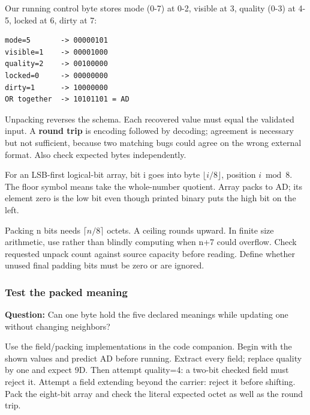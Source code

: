 Our running control byte stores mode (0-7) at 0-2, visible at 3, quality (0-3) at 4-5, locked at 6, dirty at 7:

\begin{verbatim}
mode=5       -> 00000101
visible=1    -> 00001000
quality=2    -> 00100000
locked=0     -> 00000000
dirty=1      -> 10000000
OR together  -> 10101101 = AD
\end{verbatim}

Unpacking reverses the schema. Each recovered value must equal the validated input. A \textbf{round trip} is encoding followed by decoding; agreement is necessary but not sufficient, because two matching bugs could agree on the wrong external format. Also check expected bytes independently.

For an LSB-first logical-bit array, bit i goes into byte \(\lfloor i/8\rfloor\), position \(i\bmod8\). The floor symbol means take the whole-number quotient. Array \BookInlineCode{{{[}}{1}{,}{0}{,}{1}{,}{1}{,}{0}{,}{1}{,}{0}{,}{1}{{]}}}{{[}1,0,1,1,0,1,0,1{]}} packs to AD; its element zero is the low bit even though printed binary puts the high bit on the left.

Packing n bits needs \(\lceil n/8\rceil\) octets. A ceiling rounds upward. In finite size arithmetic, use  rather than blindly computing  when n+7 could overflow. Check requested unpack count against source capacity before reading. Define whether unused final padding bits must be zero or are ignored.

\subsubsection{Test the packed meaning}\label{05-engine-i-ch001-test-the-packed-meaning}

\hypertarget{05-engine-i-ch001-test-the-packed-meaning}{}

\textbf{Question:} Can one byte hold the five declared meanings while updating one without changing neighbors?

Use the field/packing implementations in the code companion. Begin with the shown values and predict AD before running. Extract every field; replace quality by one and expect 9D. Then attempt quality=4: a two-bit checked field must reject it. Attempt a field extending beyond the carrier: reject it before shifting. Pack the eight-bit array and check the literal expected octet as well as the round trip.

